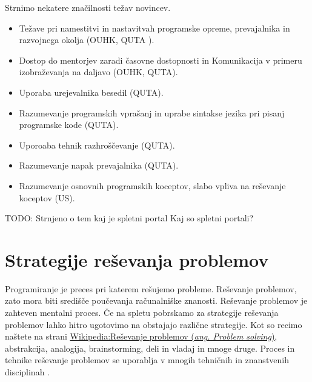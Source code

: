 Strnimo nekatere značilnosti težav novincev.

\begin{itemize}
\tightlist
\item Težave pri namestitvi in nastavitvah programske opreme,
  prevajalnika in razvojnega okolja (OUHK, QUTA ).
\item Dostop do mentorjev zaradi časovne dostopnosti in Komunikacija v
  primeru izobraževanja na daljavo (OUHK, QUTA).
\item Uporaba urejevalnika besedil (QUTA).
\item Razumevanje programskih vprašanj in uprabe sintakse jezika pri
  pisanj programske kode (QUTA).
\item Uporoaba tehnik razhroščevanje (QUTA).
\item Razumevanje napak prevajalnika (QUTA).
\item Razumevanje osnovnih programskih koceptov, slabo vpliva na
  reševanje koceptov (US).
\end{itemize}



TODO: Strnjeno o tem kaj je spletni portal Kaj so spletni portali?
\section{Strategije reševanja problemov}
\label{sec:strategije_reševanja_problemov}

Programiranje je preces pri katerem rešujemo probleme. Reševanje
problemov, zato mora biti središče poučevanja računalniške
znanosti. Reševanje problemov je zahteven mentalni proces. Če na
spletu pobrskamo za strategije reševanja problemov lahko hitro
ugotovimo na obstajajo različne strategije. Kot so recimo naštete na
strani
\href{https://en.wikipedia.org/wiki/Problem_solving#Problem-solving_strategies}{Wikipedia:Reševanje
  problemov (\emph{ang. Problem solving})}, abstrakcija, analogija,
brainstorming, deli in vladaj in mnoge druge.  Proces in tehnike
reševanje problemov se uporablja v mnogih tehničnih in znanstvenih
disciplinah \cite{guideTCS}.

